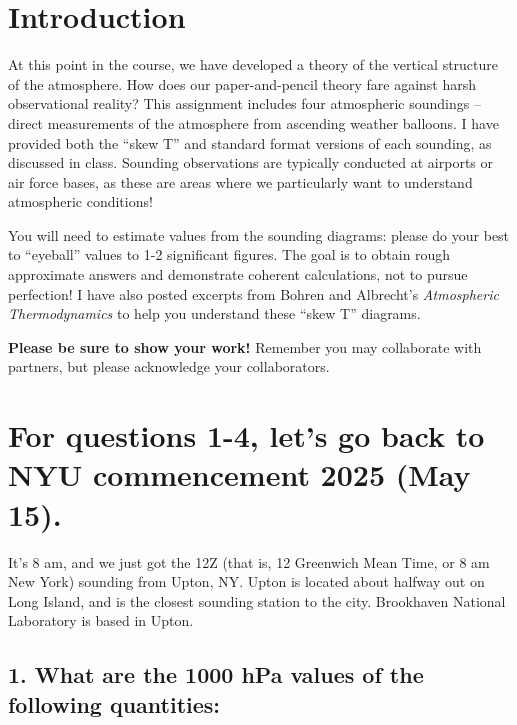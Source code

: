 \documentclass[letterpaper, 11pt]{article}
\newcommand{\1}{\mathds{1}}	%
\theoremstyle{definition}
\begin{document}
\section*{Introduction}

At this point in the course, we have developed a theory of the vertical structure of the atmosphere. How does our paper-and-pencil theory fare against harsh observational reality? This assignment includes four atmospheric soundings -- direct measurements of the atmosphere from ascending weather balloons. I have provided both the ``skew T'' and standard format versions of each sounding, as discussed in class. Sounding observations are typically conducted at airports or air force bases, as these are areas where we particularly want to understand atmospheric conditions!

You will need to estimate values from the sounding diagrams: please do your best to ``eyeball'' values to 1-2 significant figures. The goal is to obtain rough approximate answers and demonstrate coherent calculations, not to pursue perfection! I have also posted excerpts from Bohren and Albrecht's \textit{Atmospheric Thermodynamics} to help you understand these ``skew T'' diagrams.

\textbf{Please be sure to show your work!} Remember you may collaborate with partners, but please acknowledge your collaborators.

\section*{For questions 1-4, let's go back to NYU commencement 2025 (May 15).}

It's 8 am, and we just got the 12Z (that is, 12 Greenwich Mean Time, or 8 am New York) sounding from Upton, NY. Upton is located about halfway out on Long Island, and is the closest sounding station to the city. Brookhaven National Laboratory is based in Upton.

\subsection*{1. What are the 1000 hPa values of the following quantities:}
\end{document}
